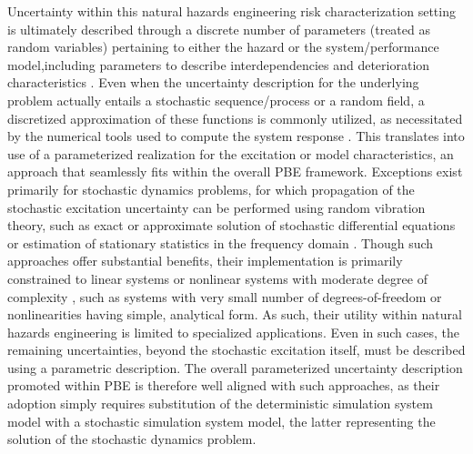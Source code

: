 Uncertainty within this natural hazards engineering risk characterization setting is ultimately described through a discrete number of parameters (treated as random variables) pertaining to either the hazard or the system/performance model,including parameters to describe interdependencies and deterioration characteristics \citep{jia2018statedependent,akiyama2020lifecycle}. Even when the uncertainty description for the underlying problem actually entails a stochastic sequence/process or a random field, a discretized approximation of these functions is commonly utilized, as necessitated by the numerical tools used to compute the system response \citep{gidaris2014surrogate}. This translates into use of a parameterized realization for the excitation or model characteristics, an approach that seamlessly fits within the overall PBE framework. Exceptions exist primarily for stochastic dynamics problems, for which propagation of the stochastic excitation uncertainty can be performed using random vibration theory, such as exact or approximate solution of stochastic differential equations or estimation of stationary statistics in the frequency domain \citep{li2009stochastic}. Though such approaches offer substantial benefits, their implementation is primarily constrained to linear systems or nonlinear systems with moderate degree of complexity \citep{dossantos2016incremental, wang2016tailequivalent}, such as systems with very small number of degrees-of-freedom or nonlinearities having simple, analytical form. As such, their utility within natural hazards engineering is limited to specialized applications. Even in such cases, the remaining uncertainties, beyond the stochastic excitation itself, must be described using a parametric description. The overall parameterized uncertainty description promoted within PBE is therefore well aligned with such approaches, as their adoption simply requires substitution of the deterministic simulation system model with a stochastic simulation system model, the latter representing the solution of the stochastic dynamics problem.


